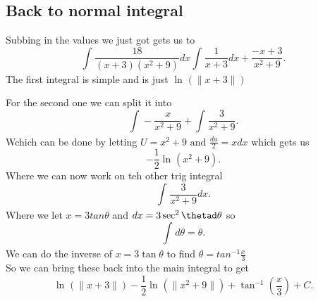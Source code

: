 \documentclass[a4paper]{article}
\begin{document}
\subsection{Back to normal integral}%
\label{sub:Back to normal integral}
Subbing in the values we just got gets us to 
\[
\int_{}^{} \frac{18}{(x+3)(x^2+9)}dx \int_{}^{} \frac{1}{x+3}dx+ \frac{-x+3}{x^2+9} 
.\] 
The first integral is simple and is just $\ln^{}(\|x+3\|)$ 

For the second one we can split it into
\[
\int_{}^{} -\frac{x}{x^2+9} + \int_{}^{} \frac{3}{x^2+9}  
.\] 
Wchich can be done by letting $U=x^2+9 \text{ and } \frac{du}{2}=xdx$
which gets us 
\[
-\frac{1}{2}\ln^{}(x^2+9)
.\] 
Where we can now work on teh other trig integral
\[
  \int_{}^{} \frac{3}{x^2+9}dx 
.\] 
Where we let $x=3tan\theta$ and  $dx=3 \sec^2\thetad\theta$
so
\[
\int_{}^{} d\theta = \theta 
.\] 
We can do the inverse of $x=3\tan\theta$ to find  $\theta = tan^{-1}\frac{x}{3}$ \\
So we can bring these back into the main integral to get
\[
\ln^{}(\|x+3\|)-\frac{1}{2}\ln^{}(\|x^2+9\|)+ \tan^{-1}(\frac{x}{3}) + C
.\] 
\end{document}
